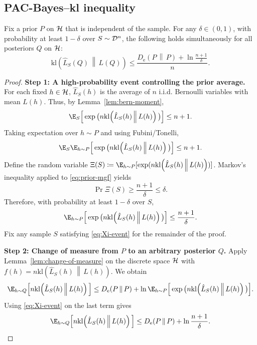 \documentclass{article}
\numberwithin{equation}{section}
\newcommand{\kl}[2]{\mathrm{kl}\!\left(#1\,\middle\|\,#2\right)}
\newcommand{\KLnat}[2]{D_{\mathrm{e}}\!\left(#2\,\middle\|\,#2\right)}
\newcommand{\cD}{{\cal D}}
\newcommand{\cH}{{\cal H}}
\begin{document}
\subsection{PAC-Bayes--kl inequality}

\begin{theorem}
\label{thm:pacbayes-kl}
Fix a prior $P$ on $\cH$ that is independent of the sample.
For any $\delta\in(0,1)$, with probability at least $1-\delta$ over $S\sim\cD^n$, the following holds simultaneously for all posteriors $Q$ on $\cH$:
\begin{equation}
\label{eq:pacbayes-kl}
    \kl{\hat L_S(Q)}{L(Q)}
    \le \frac{\KLnat{Q}{P} + \ln\frac{n+1}{\delta}}{n}.
\end{equation}
\end{theorem}
\begin{proof}
\textbf{Step 1: A high-probability event controlling the prior average.}
For each fixed $h\in\cH$, $\hat L_S(h)$ is the average of $n$ i.i.d. Bernoulli variables with mean $L(h)$.
Thus, by Lemma~\ref{lem:bern-moment},
\begin{equation}
    \E_{S}\Big[\exp\big(n\kl{\hat L_S(h)}{L(h)}\big)\Big] \le n+1.
\end{equation}
Taking expectation over $h\sim P$ and using Fubini/Tonelli,
\begin{equation}
\label{eq:prior-mgf}
    \E_{S}\E_{h\sim P}\Big[\exp\big(n\kl{\hat L_S(h)}{L(h)}\big)\Big] \le n+1.
\end{equation}
Define the random variable
\(\Xi(S) \coloneqq \E_{h\sim P}[\exp(n\kl{\hat L_S(h)}{L(h)})]\).
Markov's inequality applied to \eqref{eq:prior-mgf} yields
\begin{equation}
    \Pr{\Xi(S) \ge \frac{n+1}{\delta}} \le \delta.
\end{equation}
Therefore, with probability at least $1-\delta$ over $S$,
\begin{equation}
\label{eq:Xi-event}
    \E_{h\sim P}\Big[\exp\big(n\kl{\hat L_S(h)}{L(h)}\big)\Big]
    \le \frac{n+1}{\delta}.
\end{equation}
Fix any sample $S$ satisfying \eqref{eq:Xi-event} for the remainder of the proof.

\textbf{Step 2: Change of measure from $P$ to an arbitrary posterior $Q$.}
Apply Lemma~\ref{lem:change-of-measure} on the discrete space $\cH$ with
\(f(h)=n\kl{\hat L_S(h)}{L(h)}\).
We obtain
\begin{equation}
\label{eq:pacbayes-step2}
    \E_{h\sim Q}\Big[n\kl{\hat L_S(h)}{L(h)}\Big]
    \le \KLnat{Q}{P} + \ln \E_{h\sim P}\Big[\exp\big(n\kl{\hat L_S(h)}{L(h)}\big)\Big].
\end{equation}
Using \eqref{eq:Xi-event} on the last term gives
\begin{equation}
\label{eq:pacbayes-step3}
    \E_{h\sim Q}\Big[n\kl{\hat L_S(h)}{L(h)}\Big]
    \le \KLnat{Q}{P} + \ln\frac{n+1}{\delta}.
\end{equation}


\end{proof}
\end{document}
